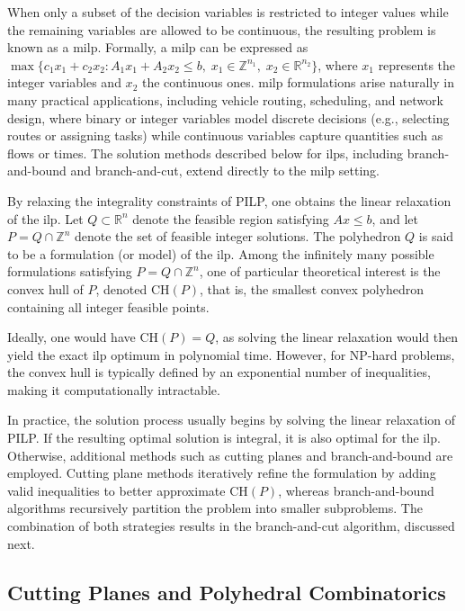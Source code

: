 When only a subset of the decision variables is restricted to integer values while the remaining variables are allowed to be continuous, the resulting problem is known as a \gls{milp}. Formally, a \gls{milp} can be expressed as $\max \{ c_1 x_1 + c_2 x_2 : A_1 x_1 + A_2 x_2 \leq b, \; x_1 \in \mathbb{Z}^{n_1}, \; x_2 \in \mathbb{R}^{n_2} \}$, where $x_1$ represents the integer variables and $x_2$ the continuous ones. \gls{milp} formulations arise naturally in many practical applications, including vehicle routing, scheduling, and network design, where binary or integer variables model discrete decisions (e.g., selecting routes or assigning tasks) while continuous variables capture quantities such as flows or times. The solution methods described below for \gls{ilp}s, including branch-and-bound and branch-and-cut, extend directly to the \gls{milp} setting.

By relaxing the integrality constraints of PILP, one obtains the linear relaxation of the \gls{ilp}. Let $Q \subset \mathbb{R}^n$ denote the feasible region satisfying $A x \leq b$, and let $P = Q \cap \mathbb{Z}^n$ denote the set of feasible integer solutions. The polyhedron $Q$ is said to be a formulation (or model) of the \gls{ilp}. Among the infinitely many possible formulations satisfying $P = Q \cap \mathbb{Z}^n$, one of particular theoretical interest is the convex hull of $P$, denoted $\text{CH}(P)$, that is, the smallest convex polyhedron containing all integer feasible points.

Ideally, one would have $\text{CH}(P) = Q$, as solving the linear relaxation would then yield the exact \gls{ilp} optimum in polynomial time. However, for NP-hard problems, the convex hull is typically defined by an exponential number of inequalities, making it computationally intractable.

In practice, the solution process usually begins by solving the linear relaxation of PILP. If the resulting optimal solution is integral, it is also optimal for the \gls{ilp}. Otherwise, additional methods such as cutting planes and branch-and-bound are employed. Cutting plane methods iteratively refine the formulation by adding valid inequalities to better approximate $\text{CH}(P)$, whereas branch-and-bound algorithms recursively partition the problem into smaller subproblems. The combination of both strategies results in the branch-and-cut algorithm, discussed next.

\subsection{Cutting Planes and Polyhedral Combinatorics}

